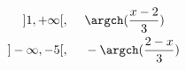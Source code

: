 \begin{align*}
 ]1,+\infty[,&\hspace{0.5cm} \argch(\frac{x-2}{3})\\
 ]-\infty,-5[,&\hspace{0.5cm} -\argch(\frac{2-x}{3})
\end{align*}
